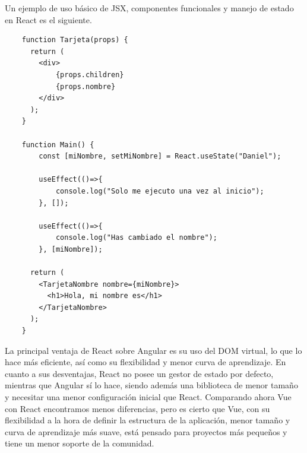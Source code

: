 \begin{ejemplo}
Un ejemplo de uso básico de JSX, componentes funcionales y manejo de estado en React es el siguiente.
    \begin{lstlisting}
    function Tarjeta(props) {
      return (
        <div>
            {props.children}
            {props.nombre}
        </div>
      );
    }
    
    function Main() {
        const [miNombre, setMiNombre] = React.useState("Daniel");
    
        useEffect(()=>{
            console.log("Solo me ejecuto una vez al inicio");
        }, []);
        
        useEffect(()=>{
            console.log("Has cambiado el nombre");
        }, [miNombre]);
        
      return (
        <TarjetaNombre nombre={miNombre}>
          <h1>Hola, mi nombre es</h1>
        </TarjetaNombre>
      );
    }
    \end{lstlisting}
\end{ejemplo}



La principal ventaja de React sobre Angular es su uso del DOM virtual, lo que lo hace más eficiente, así como su flexibilidad y menor curva de aprendizaje. En cuanto a sus desventajas, React no posee un gestor de estado por defecto, mientras que Angular sí lo hace, siendo además una biblioteca de menor tamaño y necesitar una menor configuración inicial que React. Comparando ahora Vue con React encontramos menos diferencias, pero es cierto que Vue, con su flexibilidad a la hora de definir la estructura de la aplicación, menor tamaño y curva de aprendizaje más suave, está pensado para proyectos más pequeños y tiene un menor soporte de la comunidad.\newline

